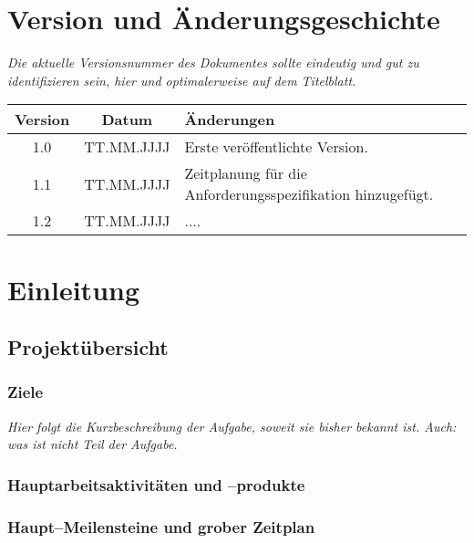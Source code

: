 \documentclass[fontsize=12pt,paper=a4,twoside]{scrartcl}
\begin{document}
\newpage



\section*{Version und Änderungsgeschichte}

{\em Die aktuelle Versionsnummer des Dokumentes sollte eindeutig und gut zu
identifizieren sein, hier und optimalerweise auf dem Titelblatt.}

\begin{tabular}{ccl}
Version & Datum & Änderungen \\
\hline
1.0 & TT.MM.JJJJ & Erste veröffentlichte Version. \\
1.1 & TT.MM.JJJJ & Zeitplanung für die Anforderungsspezifikation hinzugefügt. \\
1.2 & TT.MM.JJJJ & .... 
\end{tabular}


\section{Einleitung}

\subsection{Projektübersicht}

\subsubsection{Ziele}

{\em Hier folgt die Kurzbeschreibung der Aufgabe, soweit sie bisher
  bekannt ist. Auch: was ist {\rm nicht} Teil der Aufgabe.}

\subsubsection{Hauptarbeitsaktivitäten und --produkte}


\subsubsection{Haupt--Meilensteine und grober Zeitplan}
\end{document}
